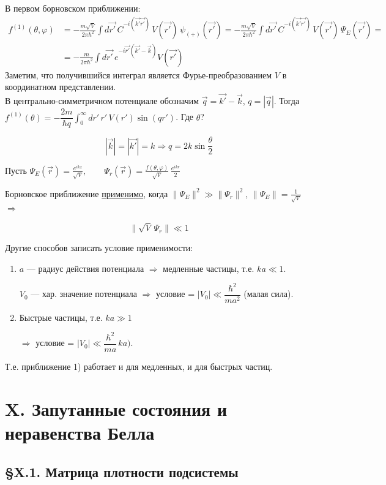 В первом борновском приближении:
\begin{align*}
	f^{(1)}(\theta,\varphi)
	&= -\frac{m \sqrt{V}}{2\pi\hbar^2} \int d\vec{r'}\,C^{-i(\vec{k'}\vec{r'})}\,V(\vec{r'})\,\psi_{(+)}(\vec{r'})
	= -\frac{m\sqrt{V}}{2\pi\hbar^2} \int d\vec{r'}\,C^{-i(\vec{k'}\vec{r'})}\,V(\vec{r'})\,\Psi_E(\vec{r'}) =\\
	&= -\frac{m}{2\pi\hbar^2} \int d\vec{r'}\,e^{-i\vec{r'}(\vec{k'} - \vec{k})}V(\vec{r'})
\end{align*}
Заметим, что получившийся интеграл является Фурье-преобразованием $V$ в координатном представлении.\\

В центрально-симметричном потенциале обозначим $\vec{q} = \vec{k'} - \vec{k}$, $q = |\vec{q}|$. Тогда $f^{(1)}(\theta) = -\dfrac{2m}{\hbar q}\int_0^\infty dr'\,r'\,V(r')\sin(q r')$. Где $\theta$?

\[
|\vec{k}| = |\vec{k'}| = k \Rightarrow q = 2k\sin\frac{\theta}{2}
\]

Пусть $ \Psi_E(\vec{r}) = \frac{e^{ikz}}{\sqrt{V}},\qquad \Psi_r(\vec{r}) = \frac{f(\theta,\varphi)}{\sqrt{V}}\,\frac{e^{ikr}}{2}$

Борновское приближение \underline{применимо}, когда $\|\Psi_E\|^2 \gg \|\Psi_r\|^2$, $\|\Psi_E\| = \tfrac{1}{\sqrt{V}}$ $\Rightarrow$

\[
\|\sqrt{V}\,\Psi_r\| \ll 1
\]

Другие способов записать условие применимости:
\begin{enumerate}
	\item $a$ --- радиус действия потенциала $\Rightarrow$ медленные частицы, т.е. $ka \ll 1$.
	
	$V_0$ --- хар. значение потенциала $\Rightarrow$ условие = $|V_0| \ll \dfrac{\hbar^2}{m a^2}$ (малая сила).
	
	\item Быстрые частицы, т.е. $ka \gg 1$
	
	$\Rightarrow$ условие = $|V_0| \ll \dfrac{\hbar^2}{ma}\,ka)$.
\end{enumerate}

Т.е. приближение 1) работает и для медленных, и для быстрых частиц.




\section{X. Запутанные состояния и неравенства Белла}

\subsection{\S X.1. Матрица плотности подсистемы}

